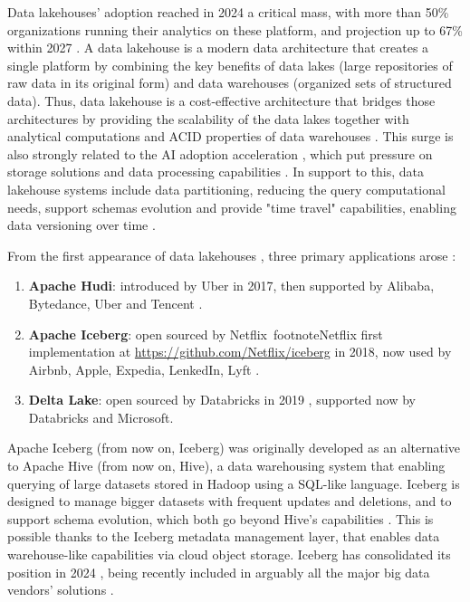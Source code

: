 Data lakehouses' adoption reached in 2024 a critical mass, with more than 50\% organizations running their analytics on these platform, and projection up to 67\% within 2027 \cite{StateDataLakehouse2025}. A data lakehouse is a modern data architecture that creates a single platform by combining the key benefits of data lakes (large repositories of raw data in its original form) and data warehouses (organized sets of structured data). Thus, data lakehouse is a cost-effective architecture \cite{DatalakehouseCostEfficiency} that bridges those architectures by providing the scalability of the data lakes together with analytical computations and \gls{ACID} properties of data warehouses \cite{lakehouse2021}. This surge is also strongly related to the AI adoption acceleration \cite{SurgeAI2024}, which put pressure on storage solutions and data processing capabilities \cite{StateDataLakehouse2025}. In support to this, data lakehouse systems include data partitioning, reducing the query computational needs, support schemas evolution and provide "time travel" capabilities, enabling data versioning over time \cite{crociDataLakehouseHype2022}.

From the first appearance of data lakehouses \cite{WhatLakehouse2020}, three primary applications arose \cite{ApacheHudiVs}: 
\begin{enumerate} 
    \item \textbf{Apache Hudi}: introduced by Uber in 2017, then supported by Alibaba, Bytedance, Uber and Tencent \cite{rajaperumalUberEngineeringIncremental2017}.
    \item \textbf{Apache Iceberg}: open sourced by Netflix~footnote{Netflix first implementation at \url{https://github.com/Netflix/iceberg}} in 2018, now used by Airbnb, Apple, Expedia, LenkedIn, Lyft \cite{IcebergExamples2024}.
    \item \textbf{Delta Lake}: open sourced by Databricks in 2019 \cite{armbrustDeltaLakeHighperformance2020}, supported now by Databricks and Microsoft.
\end{enumerate}

Apache Iceberg (from now on, Iceberg) was originally developed as an alternative to Apache Hive (from now on, Hive), a data warehousing system that enabling querying of large datasets stored in Hadoop using a \gls{SQL}-like language. Iceberg is designed to manage bigger datasets with frequent updates and deletions, and to support schema evolution, which both go beyond Hive's capabilities \cite{shiranApacheIcebergDefinitive2024}. This is possible thanks to the Iceberg metadata management layer, that enables data warehouse-like capabilities via cloud object storage. Iceberg has consolidated its position in 2024 \cite{IcebergNewHadoop}, being recently included in arguably all the major big data vendors' solutions \cite{BigDataVendorIceberg}.

